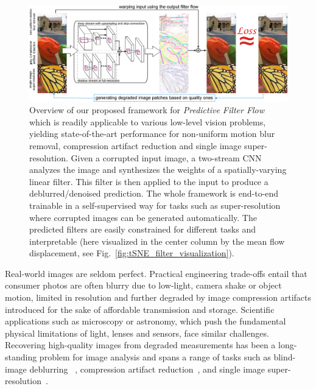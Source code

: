 \documentclass[10pt,twocolumn,letterpaper]{article}
\begin{document}
\begin{figure}[t]
    \centering
    \begin{minipage}{0.99\textwidth}
        \centering
        \includegraphics[width=1\linewidth]{diagram.png}
        \captionsetup{width=0.999\textwidth}
    \end{minipage}
    \vspace{-3mm}
    \caption{\small Overview of our proposed framework for \emph{Predictive
    Filter Flow} which is readily applicable to various low-level vision
    problems, yielding state-of-the-art performance for non-uniform motion blur
    removal, compression artifact reduction and single image super-resolution.
    Given a corrupted input image, a two-stream CNN analyzes the image and
    synthesizes the weights of a spatially-varying linear filter. This filter
    is then applied to the input to produce a deblurred/denoised prediction.
    The whole framework is end-to-end trainable in a self-supervised way for
    tasks such as super-resolution where corrupted images can be generated
    automatically.  The predicted filters are easily constrained for different
    tasks and interpretable (here visualized in the center column by the mean
    flow displacement, see Fig.~\ref{fig:tSNE_filter_visualization}).}
    \label{fig:diagram}
    \vspace{-3mm}
\end{figure}

Real-world images are seldom perfect. Practical engineering trade-offs entail
that consumer photos are often blurry due to low-light, camera shake or object
motion, limited in resolution and further degraded by image compression
artifacts introduced for the sake of affordable transmission and storage.
Scientific applications such as microscopy or astronomy, which push the
fundamental physical limitations of light, lenses and sensors, face similar
challenges. Recovering high-quality images from degraded measurements has
been a long-standing problem for image analysis and spans a range of tasks
such as blind-image deblurring ~\cite{bell1995information,kundur1996blind,
fergus2006removing,shan2008high}, compression artifact
reduction~\cite{shen1998review,list2003adaptive}, and single image
super-resolution~\cite{park2003super,yang2010image}.
\end{document}
